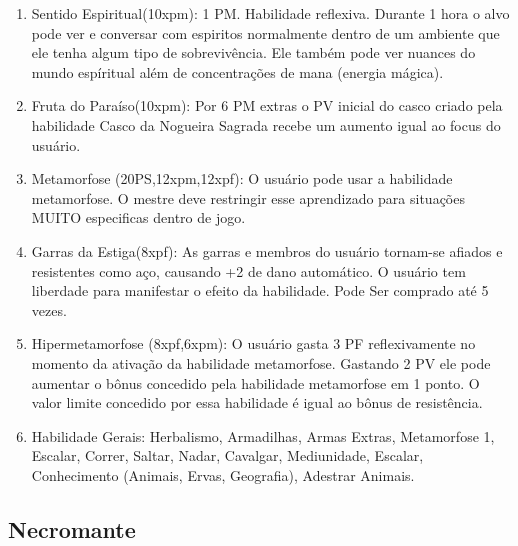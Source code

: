 \begin{enumerate}
		\item Sentido Espiritual(10xpm): 1 PM. Habilidade reflexiva.\newline
Durante 1 hora o alvo pode ver e conversar com espiritos normalmente dentro de um ambiente que ele tenha algum tipo de sobrevivência. Ele também pode ver nuances do mundo espíritual além de concentrações de mana (energia mágica). 

			\item Fruta do Paraíso(10xpm): Por 6 PM extras o PV inicial do casco criado pela habilidade Casco da Nogueira Sagrada recebe um aumento igual ao focus do usuário.

		\item Metamorfose (20PS,12xpm,12xpf): O usuário pode usar a habilidade metamorfose. O mestre deve restringir esse aprendizado para situações MUITO especificas dentro de jogo.

  	\item Garras da Estiga(8xpf): As garras e membros do usuário tornam-se afiados e resistentes como aço, causando +2 de dano automático. O usuário tem liberdade para manifestar o efeito da habilidade. Pode Ser comprado até 5 vezes.

		\item Hipermetamorfose (8xpf,6xpm): O usuário gasta 3 PF reflexivamente no momento da ativação da habilidade metamorfose. Gastando 2 PV ele pode aumentar o bônus concedido pela habilidade metamorfose em 1 ponto. O valor limite concedido por essa habilidade é igual ao bônus de resistência.
  
  	\item Habilidade Gerais: Herbalismo, Armadilhas, Armas Extras, Metamorfose 1, Escalar, Correr, Saltar, Nadar, Cavalgar, Mediunidade, Escalar, Conhecimento (Animais, Ervas, Geografia), Adestrar Animais. 
\end{enumerate}

  
  
  \subsection{Necromante}
  
